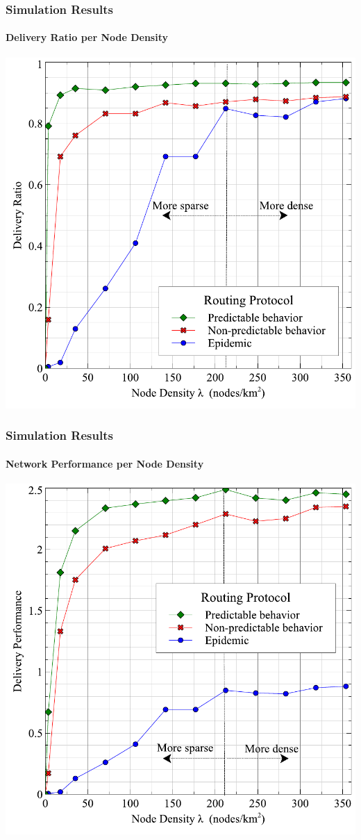 \documentclass{beamer}
\begin{document}
\begin{frame}
	\frametitle{Simulation Results}
	\framesubtitle{Delivery Ratio per Node Density}
	\begin{center}
		\includegraphics[height=0.75\textheight]{Graphs/DeliveryRatio.pdf}
	\end{center}
\end{frame}
\begin{frame}
	\frametitle{Simulation Results}
	\framesubtitle{Network Performance per Node Density}
	\begin{center}
		\includegraphics[height=0.75\textheight]{Graphs/NetworkPerformance.pdf}
	\end{center}
\end{frame}
\end{document}
